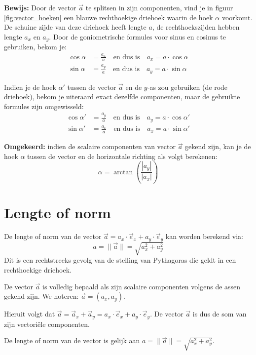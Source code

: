 \documentclass{ximera}
\begin{document}
\textbf{Bewijs:} Door de vector $\vec{a}$ te splitsen in zijn componenten, vind je in figuur \ref{fig:vector_hoeken} een blauwe rechthoekige driehoek waarin de hoek $\alpha$ voorkomt. De schuine zijde van deze driehoek heeft lengte $a$, de rechthoekszijden hebben lengte $a_x$ en $a_y$. Door de goniometrische formules voor sinus en cosinus te gebruiken, bekom je:
\begin{align*}
    \cos \alpha &= \frac{a_x}{a} \quad \text{en dus is} \quad a_x = a \cdot \cos \alpha \\
    \sin \alpha &= \frac{a_y}{a} \quad \text{en dus is} \quad a_y = a \cdot \sin \alpha
\end{align*}     

Indien je de hoek $\alpha '$ tussen de vector $\vec{a}$ en de $y$-as zou gebruiken (de rode driehoek), bekom je uiteraard exact dezelfde componenten, maar de gebruikte formules zijn omgewisseld:
\begin{align*}
    \cos \alpha' &= \frac{a_y}{a} \quad \text{en dus is} \quad a_y = a \cdot \cos \alpha' \\
    \sin \alpha' &= \frac{a_x}{a} \quad \text{en dus is} \quad a_x = a \cdot \sin \alpha'
\end{align*} 

\textbf{Omgekeerd:} indien de scalaire componenten van vector $\vec{a}$ gekend zijn, kan je de hoek $\alpha$ tussen de vector en de horizontale richting als volgt berekenen:
\[ \alpha = \arctan\left(\frac{|a_{y}|}{|a_{x}|}\right) \] 
    

\section{Lengte of norm}

De lengte of norm van de vector $\vec{a} = a_{x} \cdot \vec{e}_{x} + a_{y} \cdot \vec{e}_{y}$ kan worden berekend via:
\[ a = \| \vec{a} \| = \sqrt{a_{x}^{2} + a_{y}^{2}} \] 
Dit is een rechtstreeks gevolg van de stelling van Pythagoras die geldt in een rechthoekige driehoek.

\begin{proposition}[title={Besluit: vectorcomponenten en norm}]\nl
    De vector $\vec{a}$ is volledig bepaald als zijn scalaire componenten volgens de assen gekend zijn. We noteren: $\vec{a} = (a_{x}, a_{y})$.
    
    Hieruit volgt dat $\vec{a} = \vec{a}_{x} + \vec{a}_{y} = a_{x} \cdot \vec{e}_{x} + a_{y} \cdot \vec{e}_{y}$. De vector $\vec{a}$ is dus de som van zijn vectoriële componenten.
    
    De lengte of norm van de vector is gelijk aan $a = \| \vec{a} \| = \sqrt{a_{x}^{2} + a_{y}^{2}}$.
\end{proposition}
\end{document}
